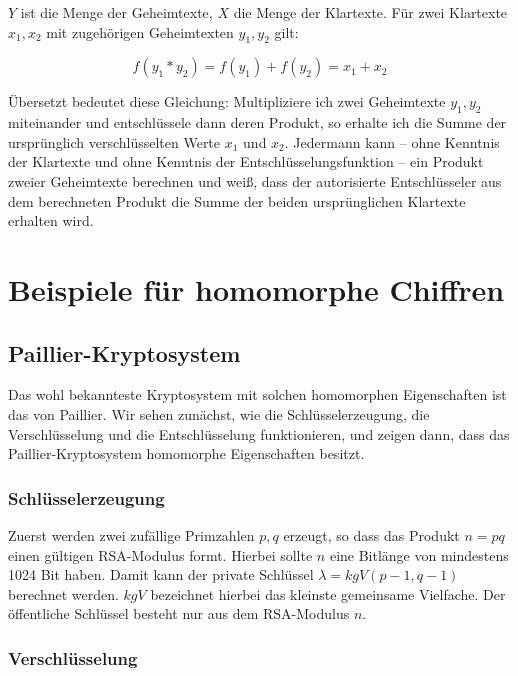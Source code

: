 \begin{refsegment}
$Y$ ist die Menge der Geheimtexte, $X$ die Menge der Klartexte.
Für zwei Klartexte $x_1, x_2$ mit zugehörigen Geheimtexten $y_1, y_2$ gilt:

$$f(y_1  * y_2) = f(y_1) + f(y_2) = x_1  + x_2$$

Übersetzt bedeutet diese Gleichung: Multipliziere ich zwei Geheimtexte $y_1, y_2$ miteinander und entschlüssele dann deren Produkt, so erhalte ich die Summe der ursprünglich verschlüsselten Werte $x_1$ und $x_2$. Jedermann kann -- ohne Kenntnis der Klartexte und ohne Kenntnis der Entschlüsselungsfunktion -- ein Produkt zweier Geheimtexte berechnen und weiß, dass der autorisierte Entschlüsseler aus dem berechneten Produkt  die Summe der beiden ursprünglichen Klartexte erhalten wird.

\section{Beispiele für homomorphe Chiffren}

\subsection{Paillier-Kryptosystem}

Das wohl bekannteste Kryptosystem mit solchen homomorphen Eigenschaften ist das von Paillier\allowbreak\cite{Paillier1999}. Wir sehen zunächst, wie die Schlüsselerzeugung, die Verschlüsselung und die Entschlüsselung funktionieren, und zeigen dann, dass das Paillier-Kryptosystem homomorphe Eigenschaften besitzt.

\subsubsection{Schlüsselerzeugung}

Zuerst werden zwei zufällige Primzahlen $p,q$ erzeugt, so dass das Produkt $n=pq$ einen gültigen RSA-Modulus formt. Hierbei sollte $n$ eine Bitlänge von mindestens 1024 Bit haben.
Damit kann der private Schlüssel $\lambda = \textit{kgV}(p-1,q-1)$ berechnet werden. $\textit{kgV}$ bezeichnet hierbei das kleinste gemeinsame Vielfache. Der öffentliche Schlüssel besteht nur aus dem RSA-Modulus $n$.

\subsubsection{Verschlüsselung}


\end{refsegment}
